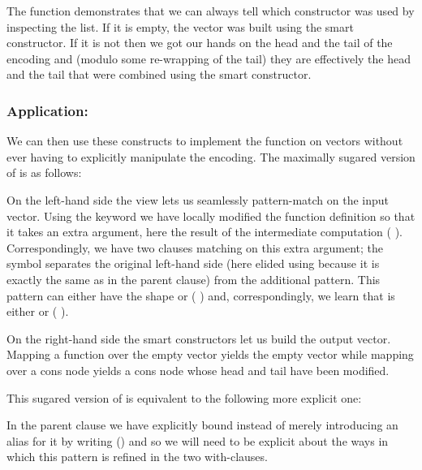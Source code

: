 The function  demonstrates that we can always tell which
constructor was used by inspecting the  list. If it
is empty, the vector was built using the  smart constructor.
If it is not then we got our hands on the head and the tail of the encoding
and (modulo some re-wrapping of the tail) they are effectively the head and the
tail that were combined using the smart constructor.

\subsubsection{Application: }

We can then use these constructs to implement the function 
on vectors without ever having to explicitly manipulate the encoding.
%
The maximally sugared version of  is as follows:


On the left-hand side the view lets us seamlessly pattern-match on the input
vector.
%
Using the  keyword we have locally modified the function
definition so that it takes an extra argument, here the result of the intermediate
computation ( ).
%
Correspondingly, we have two clauses matching on this extra argument;
the symbol \IdrisKeyword{|} separates the original left-hand side
(here elided using \IdrisKeyword{\KatlaUnderscore{}} because it is exactly the
same as in the parent clause) from the additional pattern.
%
This pattern can
either have the shape \IdrisData{[]} or ( \IdrisData{::} )
and, correspondingly, we learn that  is either \IdrisFunction{[]} or
( \IdrisFunction{::} ).

On the right-hand side the smart constructors let us build the output vector.
Mapping a function over the empty vector yields the empty vector while mapping
over a cons node yields a cons node whose head and tail have been
modified.


This sugared version of  is equivalent to the following more
explicit one:


In the parent clause we have explicitly bound 
instead of merely introducing an alias for it by writing
{(\IdrisKeyword{\_})}
and so we will need to be explicit about the ways in which this
pattern is refined in the two with-clauses.

